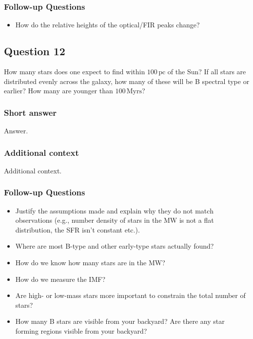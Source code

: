 \documentclass[a4paper,10pt]{article}
\begin{document}
\newpage
\subsubsection{Follow-up Questions}

\begin{itemize}
    \item How do the relative heights of the optical/FIR peaks change?
\end{itemize}


\newpage
\subsection{Question 12}

How many stars does one expect to find within $100\,\mathrm{pc}$ of the Sun? If all stars are distributed evenly across the galaxy, how many of these will be B spectral type or earlier? How many are younger than $100\,\mathrm{Myrs}$?

\subsubsection{Short answer}

Answer.

\subsubsection{Additional context}

Additional context.

\subsubsection{Follow-up Questions}

\begin{itemize}
    \item Justify the assumptions made and explain why they do not match observations (e.g., number density of stars in the MW is not a flat distribution, the SFR isn't constant etc.).
    \item Where are most B-type and other early-type stars actually found?
    \item How do we know how many stars are in the MW?
    \item How do we measure the IMF?
    \item Are high- or low-mass stars more important to constrain the total number of stars?
    \item How many B stars are visible from your backyard? Are there any star forming regions visible from your backyard?
\end{itemize}
\end{document}
